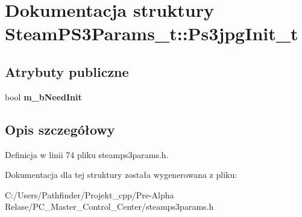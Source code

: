 \hypertarget{struct_steam_p_s3_params__t_1_1_ps3jpg_init__t}{}\section{Dokumentacja struktury Steam\+P\+S3\+Params\+\_\+t\+:\+:Ps3jpg\+Init\+\_\+t}
\label{struct_steam_p_s3_params__t_1_1_ps3jpg_init__t}
\subsection*{Atrybuty publiczne}
\begin{DoxyCompactItemize}
\item 
\mbox{\label{struct_steam_p_s3_params__t_1_1_ps3jpg_init__t_a33a5eb95db6a7c5d5bedaf521869eb39}} 
bool {\bfseries m\+\_\+b\+Need\+Init}
\end{DoxyCompactItemize}


\subsection{Opis szczegółowy}


Definicja w linii 74 pliku steamps3params.\+h.



Dokumentacja dla tej struktury została wygenerowana z pliku\+:\begin{DoxyCompactItemize}
\item 
C\+:/\+Users/\+Pathfinder/\+Projekt\+\_\+cpp/\+Pre-\/\+Alpha Relase/\+P\+C\+\_\+\+Master\+\_\+\+Control\+\_\+\+Center/steamps3params.\+h\end{DoxyCompactItemize}

